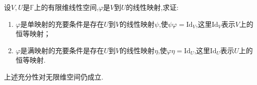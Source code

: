 \documentclass[../../main.tex]{subfiles}%
\begin{document}
\begin{proposition}\label{proposition:线性映射是单射或满射的充要条件1}
设\(V,U\)是\(\mathbb{F}\)上的有限维线性空间,\(\varphi\)是\(V\)到\(U\)的线性映射,求证:
\begin{enumerate}[(1)]
\item  \(\varphi\)是单映射的充要条件是存在\(U\)到\(V\)的线性映射\(\psi\),使\(\psi\varphi = \text{Id}_V\),这里\(\text{Id}_V\)表示\(V\)上的恒等映射；

\item \(\varphi\)是满映射的充要条件是存在\(U\)到\(V\)的线性映射\(\eta\),使\(\varphi\eta = \text{Id}_U\),这里\(\text{Id}_U\)表示\(U\)上的恒等映射.
\end{enumerate}
\end{proposition}
\begin{note}
上述充分性对无限维空间仍成立.
\end{note}
\end{document}
